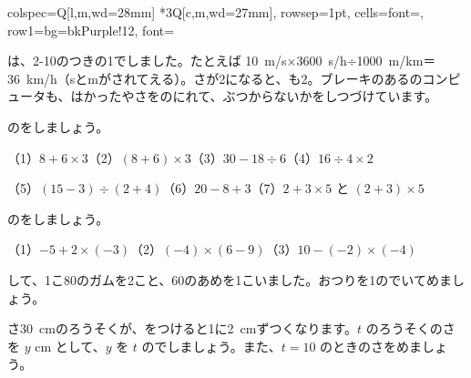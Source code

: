 \begin{butsuri}
\begin{bkcenter}
\begin{bktable}{colspec={Q[l,m,wd=28mm] *{3}{Q[c,m,wd=27mm]}}, rowsep=1pt, cells={font=\small}, row{1}={bg=bkPurple!12, font=\footnotesize}}
\end{bktable}
\end{bkcenter}
は、2-10のつきの1でしました。たとえば \mbox{\qty{10}{m/s}×\qty{3600}{s/h}÷\qty{1000}{m/km}＝\qty{36}{km/h}}（sとmがされてえる）。さが2になると、も2。ブレーキのあるのコンピュータも、はかったやさをのにれて、ぶつからないかをしつづけています。
\end{butsuri}



\clearpage
\bkendproblems
{}

\bkproblem {}のをしましょう。\par
（1）\nobreak $8+6\times3$\quad（2）\nobreak $(8+6)\times3$\quad（3）\nobreak $30-18\div6$\quad（4）\nobreak $16\div4\times2$\par
（5）\nobreak $(15-3)\div(2+4)$\quad（6）\nobreak $20-8+3$\quad（7）\nobreak $2+3\times5$ と $(2+3)\times5$

\bkproblem {}のをしましょう。\par
（1）\nobreak $-5+2\times(-3)$\quad（2）\nobreak $(-4)\times(6-9)$\quad（3）\nobreak $10-(-2)\times(-4)$

して、1こ80のガムを2こと、60のあめを1こいました。おつりを1のでいてめましょう。

\bkproblem {}さ\qty{30}{cm}のろうそくが、をつけると1に\qty{2}{cm}ずつくなります。$t$ のろうそくのさを $y$ cm として、$y$ を $t$ のでしましょう。また、$t=10$ のときのさをめましょう。

